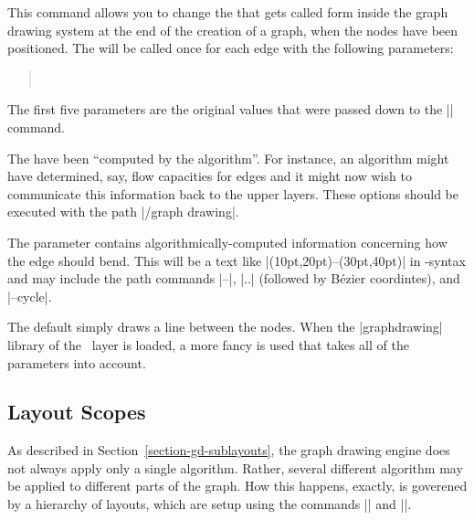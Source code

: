 \begin{command}{\pgfgdsetedgecallback{}}
  This command allows you to change the  that gets called
  form inside the graph drawing system at the end of the creation of a
  graph, when the nodes have been positioned. The  will be 
  called once for each edge with the following parameters:
  \begin{quote}
    \\
  \end{quote}

  The first five parameters are the original values that were passed
  down to the |\pgfgdedge| command.
  
  The  have been ``computed by the
  algorithm''. For instance, an algorithm might have determined, say,
  flow capacities for edges and it might now wish to communicate this
  information back to the upper layers. These options should be
  executed with the path |/graph drawing|.
  
  The parameter  contains
  algorithmically-computed information concerning how the 
  edge should bend. This will be a text like
  |(10pt,20pt)--(30pt,40pt)| in \tikzname-syntax and may include the
  path commands |--|,  |..| (followed by B\'ezier coordintes), and
  |--cycle|. 

  The default  simply draws a line between the nodes. When
  the |graphdrawing| library of the \tikzname\ layer is loaded, a more
  fancy  is used that takes all of the parameters into
  account.
\end{command}



\subsection{Layout Scopes}

As described in Section~\ref{section-gd-sublayouts}, the graph drawing
engine does not always apply only a single algorithm. Rather, several
different algorithm may be applied to different parts of the
graph. How this happens, exactly, is goverened by a hierarchy of
layouts, which are setup using the commands |\pgfgdbeginlayout| and
|\pgfgdendlayout|.


